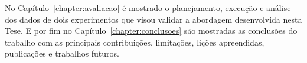 No Capítulo~\ref{chapter:avaliacao} é mostrado o planejamento, execução e análise dos dados de dois experimentos que visou validar a abordagem desenvolvida nesta Tese.  E por fim no Capítulo~\ref{chapter:conclusoes} são mostradas as conclusões do trabalho com as principais contribuições, limitações, lições apreendidas, publicações e trabalhos futuros.



